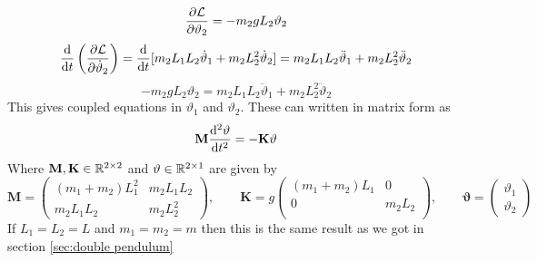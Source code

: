 \documentclass{article}
\newcommand{\mat}[1]{\mathbf{#1}}
\newcommand{\LL}{\mathcal{L}}
\begin{document}
    \[\pdv{\LL}{\vartheta_2} = -m_2gL_2\vartheta_2\]
    \[\dv{t}\left(\pdv{\LL}{\dot\vartheta_2}\right) = \dv{t}[m_2L_1L_2\dot\vartheta_1 + m_2L_2^2\dot\vartheta_2] = m_2L_1L_2\ddot\vartheta_1 + m_2L_2^2\ddot\vartheta_2\]
    \[-m_2gL_2\vartheta_2 = m_2L_1L_2\ddot\vartheta_1 + m_2L_2^2\ddot\vartheta_2\]
    This gives coupled equations in \(\vartheta_1\) and \(\vartheta_2\).
    These can written in matrix form as
    \[\mat{M}\dv[2]{\mat{\vartheta}}{t} = -\mat{K}\mat{\vartheta}\]
    Where \(\mat M, \mat K\in\bb R^{2\times2}\) and \(\vartheta\in\mathbb{R}^{2\times 1}\) are given by
    \[
        \mat M = 
        \begin{pmatrix}
            (m_1 + m_2)L_1^2 & m_2L_1L_2\\
            m_2L_1L_2 & m_2L_2^2
        \end{pmatrix}
        ,\qquad
        \mat K = g
        \begin{pmatrix}
            (m_1 + m_2)L_1 & 0\\
            0 & m_2L_2\\
        \end{pmatrix}
        ,\qquad
        \mat \vartheta = 
        \begin{pmatrix}
            \vartheta_1 \\ \vartheta_2
        \end{pmatrix}
    \]
    If \(L_1 = L_2 = L\) and \(m_1 = m_2 = m\)  then this is the same result as we got in section \ref{sec:double pendulum}
    
\end{document}
